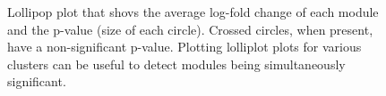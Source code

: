 \documentclass[
  letterpaper,
  DIV=11,
  numbers=noendperiod]{scrartcl}
\begin{document}
\begin{figure}[H]


\caption{\label{fig-lol2}Lollipop plot that shovs the average log-fold
change of each module and the p-value (size of each circle). Crossed
circles, when present, have a non-significant p-value. Plotting
lolliplot plots for various clusters can be useful to detect modules
being simultaneously significant.}

\end{figure}%
\end{document}
